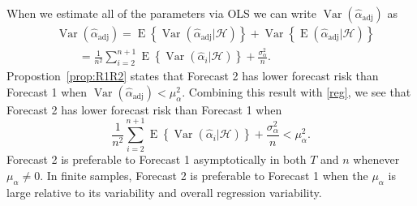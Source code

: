 \documentclass[11pt]{article}
\newcommand{\x}{\textbf{x}}
\newcommand{\Hist}{\mathcal{H}}
\DeclareMathOperator{\E}{E}
\DeclareMathOperator{\Var}{Var}
\begin{document}
When we estimate all of the parameters via OLS we can write 
$\Var(\hat{\alpha}_{\text{adj}})$ as
\begin{equation}
\begin{split}
  &\Var(\hat{\alpha}_{\text{adj}}) = \E\left\{\Var(\hat{\alpha}_{\text{adj}}|\Hist)\right\} 
    + \Var\left\{\E(\hat{\alpha}_{\text{adj}}|\Hist)\right\} \\
  &\qquad= \frac{1}{n^2} \sum_{i=2}^{n+1} \E\left\{\Var(\hat{\alpha}_i|\Hist)\right\} 
    + \frac{\sigma_{\alpha}^2}{n}. %
\label{reg}
\end{split}
\end{equation}
Propostion~\ref{prop:R1R2} states that Forecast 2 has lower forecast risk 
than Forecast 1 when  
$
  \Var(\hat{\alpha}_{\text{adj}}) 
    < \mu_{\alpha}^2.
$
Combining this result with \eqref{reg}, we see that Forecast 2 has lower 
forecast risk than Forecast 1 when 
$$
  \frac{1}{n^2} \sum_{i=2}^{n+1} \E\left\{\Var(\hat{\alpha}_i|\Hist)\right\} 
    + \frac{\sigma_{\alpha}^2}{n} < \mu_{\alpha}^2.
$$
Forecast 2 is preferable to Forecast 1 asymptotically in both $T$ and $n$ 
whenever $\mu_{\alpha} \neq 0$. In finite samples, Forecast 2 is preferable to 
Forecast 1 when the $\mu_{\alpha}$ is large relative to its variability and 
overall regression variability.  














\end{document}
